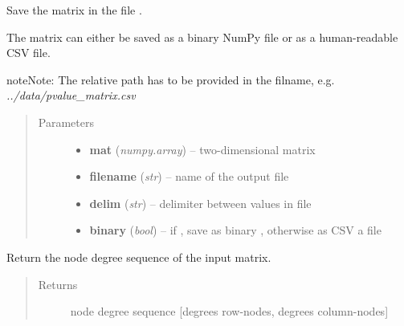 \documentclass[letterpaper,10pt,english]{sphinxmanual}
\begin{document}
\begin{fulllineitems}
\begin{fulllineitems}
\end{fulllineitems}


\begin{fulllineitems}
\label{source/src:src.bicm.BiCM.save_matrix}
Save the matrix  in the file .

The matrix can either be saved as a binary NumPy  file or as a
human-readable CSV file.

\begin{notice}{note}{Note:}
The relative path has to be provided in the filname, e.g.
\emph{../data/pvalue\_matrix.csv}
\end{notice}
\begin{quote}\begin{description}
\item[{Parameters}] \leavevmode\begin{itemize}
\item {} 
\textbf{mat} (\emph{numpy.array}) -- two-dimensional matrix

\item {} 
\textbf{filename} (\emph{str}) -- name of the output file

\item {} 
\textbf{delim} (\emph{str}) -- delimiter between values in file

\item {} 
\textbf{binary} (\emph{bool}) -- if , save as binary ,
otherwise as CSV a file

\end{itemize}

\end{description}\end{quote}

\end{fulllineitems}


\begin{fulllineitems}
\label{source/src:src.bicm.BiCM.set_degree_seq}
Return the node degree sequence of the input matrix.
\begin{quote}\begin{description}
\item[{Returns}] \leavevmode
node degree sequence {[}degrees row-nodes, degrees column-nodes{]}


\end{description}
\end{quote}
\end{fulllineitems}
\end{fulllineitems}
\end{document}
